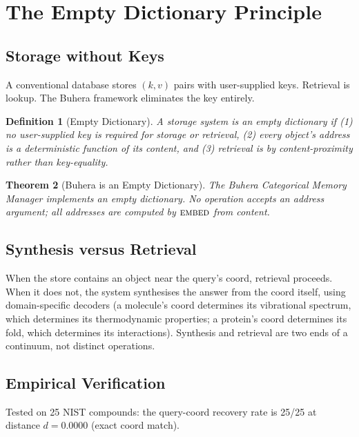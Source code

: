 \documentclass[twocolumn,11pt,a4paper]{article}
\newtheorem{theorem}{Theorem}[section]
\newtheorem{definition}[theorem]{Definition}
\begin{document}
\section{The Empty Dictionary Principle}
\label{sec:empty_dictionary}

\subsection{Storage without Keys}

A conventional database stores $(k, v)$ pairs with user-supplied keys. Retrieval is lookup. The Buhera framework eliminates the key entirely.

\begin{definition}[Empty Dictionary]
A storage system is an \emph{empty dictionary} if (1) no user-supplied key is required for storage or retrieval, (2) every object's address is a deterministic function of its content, and (3) retrieval is by content-proximity rather than key-equality.
\end{definition}

\begin{theorem}[Buhera is an Empty Dictionary]
The Buhera Categorical Memory Manager implements an empty dictionary. No operation accepts an address argument; all addresses are computed by $\textsc{embed}$ from content.
\end{theorem}

\subsection{Synthesis versus Retrieval}

When the store contains an object near the query's coord, retrieval proceeds. When it does not, the system synthesises the answer from the coord itself, using domain-specific decoders (a molecule's coord determines its vibrational spectrum, which determines its thermodynamic properties; a protein's coord determines its fold, which determines its interactions). Synthesis and retrieval are two ends of a continuum, not distinct operations.

\subsection{Empirical Verification}

Tested on 25 NIST compounds: the query-coord recovery rate is 25/25 at distance $d = 0.0000$ (exact coord match).
\end{document}
